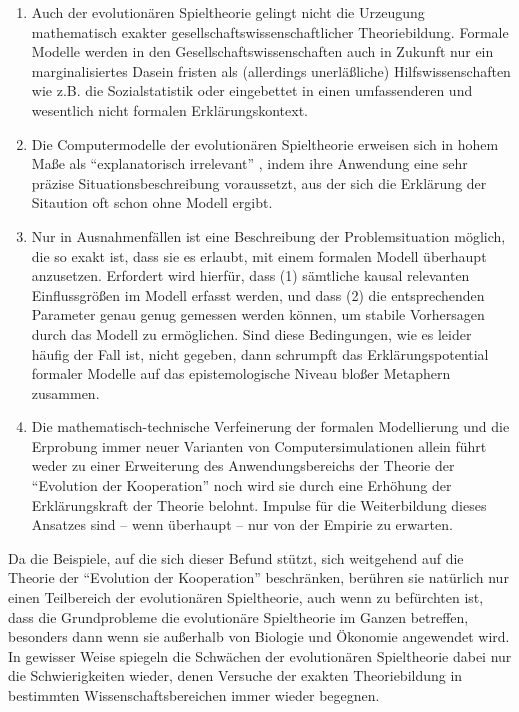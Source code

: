 \documentclass[12pt,a4paper,ngerman]{article}
\begin{document}
\begin{enumerate} 

\item Auch der
evolutionären Spieltheorie gelingt nicht die Urzeugung mathematisch
exakter gesellschaftswissenschaftlicher Theoriebildung. Formale
Modelle werden in den Gesellschaftswissenschaften auch in Zukunft nur
ein marginalisiertes Dasein fristen als (allerdings unerläßliche)
Hilfswissenschaften wie z.B. die Sozialstatistik oder eingebettet in
einen umfassenderen und wesentlich nicht formalen Erklärungskontext.

\item Die Computermodelle der evolutionären Spieltheorie erweisen sich
in hohem Maße als "`explanatorisch irrelevant"' \cite{alexander:2003},
indem ihre Anwendung eine sehr präzise Situationsbeschreibung
voraussetzt, aus der sich die Erklärung der Sitaution oft schon ohne
Modell ergibt.  

\item Nur in Ausnahmenfällen ist eine
Beschreibung der Problemsituation möglich, die so exakt ist, dass sie
es erlaubt, mit einem formalen Modell überhaupt anzusetzen. Erfordert
wird hierfür, dass (1) sämtliche kausal relevanten Einflussgrößen im
Modell erfasst werden, und dass (2) die entsprechenden Parameter genau
genug gemessen werden können, um stabile Vorhersagen durch das Modell
zu ermöglichen. Sind diese Bedingungen, wie es leider häufig der Fall ist,
nicht gegeben, dann schrumpft das Erklärungspotential formaler Modelle
auf das epistemologische Niveau bloßer Metaphern zusammen.  

\item Die
mathematisch-technische Verfeinerung der formalen Modellierung und die
Erprobung immer neuer Varianten von Computersimulationen allein führt
weder zu einer Erweiterung des Anwendungsbereichs der Theorie der
"`Evolution der Kooperation"' noch wird sie durch eine Erhöhung der
Erklärungskraft der Theorie belohnt. Impulse für die Weiterbildung
dieses Ansatzes sind -- wenn überhaupt -- nur von der Empirie zu erwarten.

\end{enumerate} 

Da die Beispiele, auf die sich dieser Befund stützt, sich weitgehend
auf die Theorie der "`Evolution der Kooperation"' beschränken,
berühren sie natürlich nur einen Teilbereich der
evolutionären Spieltheorie, auch wenn zu befürchten ist, dass die
Grundprobleme die evolutionäre Spieltheorie im Ganzen
betreffen, besonders dann wenn sie außerhalb von Biologie und Ökonomie
angewendet wird. In gewisser Weise spiegeln die Schwächen der evolutionären
Spieltheorie dabei nur die Schwierigkeiten wieder, denen Versuche der
exakten Theoriebildung in bestimmten Wissenschaftsbereichen immer
wieder begegnen. 
\end{document}
